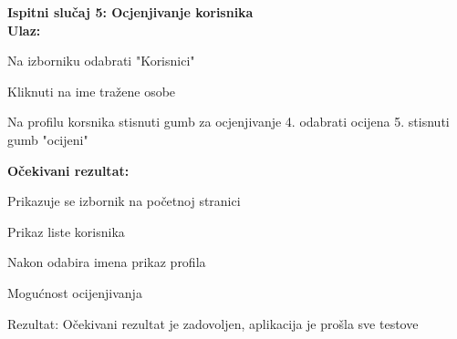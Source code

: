         \noindent \textbf{Ispitni slučaj 5: Ocjenjivanje korisnika}\\
			 \medskip
            \noindent\textbf{Ulaz:}
            \begin{packed_enum}
            \item  Na izborniku odabrati "Korisnici"
            \item Kliknuti na ime tražene osobe
            \item Na profilu korsnika stisnuti gumb za ocjenjivanje  4. odabrati ocijena 5. stisnuti gumb "ocijeni"
            \end{packed_enum}
            
            \noindent\textbf{Očekivani rezultat:}
            \begin{packed_enum}
            \item Prikazuje se izbornik na početnoj stranici
            \item Prikaz  liste korisnika
            \item Nakon odabira imena prikaz profila
            \item Mogućnost ocijenjivanja 
            \end{packed_enum}
            
            \noindent \text
            Rezultat: Očekivani rezultat je zadovoljen, aplikacija je prošla sve testove \\  
            
